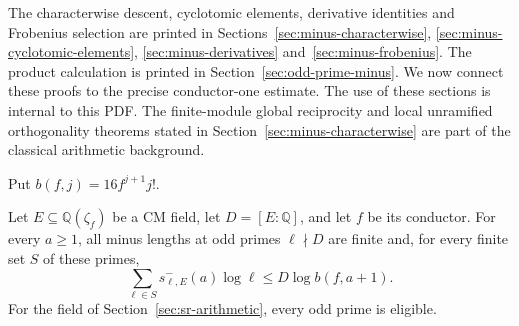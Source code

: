 The characterwise descent, cyclotomic elements, derivative identities and
Frobenius selection are printed in
Sections~\ref{sec:minus-characterwise},
\ref{sec:minus-cyclotomic-elements},
\ref{sec:minus-derivatives} and~\ref{sec:minus-frobenius}.
The product calculation is printed in Section~\ref{sec:odd-prime-minus}.
We now connect these proofs to the precise conductor-one estimate.
The use of these sections is internal to this PDF.
The finite-module global reciprocity and local unramified orthogonality
theorems stated in Section~\ref{sec:minus-characterwise} are part of the
classical arithmetic background.

Put \(b(f,j)=16f^{j+1}j!\).
\begin{srproposition}\label{prop:sr-PB}
Let \(E\subseteq\mathbb Q(\zeta_f)\) be a CM field, let
\(D=[E:\mathbb Q]\), and let \(f\) be its conductor.
For every \(a\geq1\), all minus lengths at odd primes \(\ell\nmid D\)
are finite and, for every finite set \(S\) of these primes,
\begin{equation}\label{eq:sr-PB}
 \sum_{\ell\in S}s^-_{\ell,E}(a)\log\ell
       \leq D\log b(f,a+1).
\end{equation}
For the field of Section~\ref{sec:sr-arithmetic}, every odd prime is eligible.
\end{srproposition}
